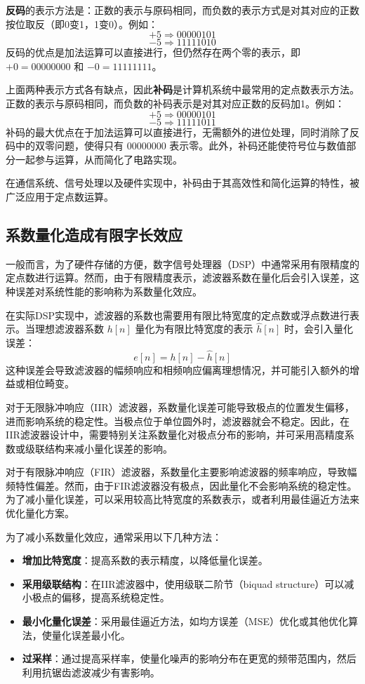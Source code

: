 \textbf{反码}的表示方法是：正数的表示与原码相同，而负数的表示方式是对其对应的正数按位取反（即0变1，1变0）。例如：
\[
+5 \Rightarrow 00000101
\]
\[
-5 \Rightarrow 11111010
\]
反码的优点是加法运算可以直接进行，但仍然存在两个零的表示，即 \(+0 = 00000000\) 和 \(-0 = 11111111\)。


上面两种表示方式各有缺点，因此\textbf{补码}是计算机系统中最常用的定点数表示方法。正数的表示与原码相同，而负数的补码表示是对其对应正数的反码加1。例如：
\[
+5 \Rightarrow 00000101
\]
\[
-5 \Rightarrow 11111011
\]
补码的最大优点在于加法运算可以直接进行，无需额外的进位处理，同时消除了反码中的双零问题，使得只有 \(00000000\) 表示零。此外，补码还能使符号位与数值部分一起参与运算，从而简化了电路实现。

在通信系统、信号处理以及硬件实现中，补码由于其高效性和简化运算的特性，被广泛应用于定点数运算。
\subsection{系数量化造成有限字长效应}
一般而言，为了硬件存储的方便，数字信号处理器（DSP）中通常采用有限精度的定点数进行运算。然而，由于有限精度表示，滤波器系数在量化后会引入误差，这种误差对系统性能的影响称为系数量化效应。

在实际DSP实现中，滤波器的系数也需要用有限比特宽度的定点数或浮点数进行表示。当理想滤波器系数 \( h[n] \) 量化为有限比特宽度的表示 \( \hat{h}[n] \) 时，会引入量化误差：
\begin{equation}
e[n] = h[n] - \hat{h}[n]
\end{equation}
这种误差会导致滤波器的幅频响应和相频响应偏离理想情况，并可能引入额外的增益或相位畸变。


对于无限脉冲响应（IIR）滤波器，系数量化误差可能导致极点的位置发生偏移，进而影响系统的稳定性。当极点位于单位圆外时，滤波器就会不稳定。因此，在IIR滤波器设计中，需要特别关注系数量化对极点分布的影响，并可采用高精度系数或级联结构来减小量化误差的影响。


对于有限脉冲响应（FIR）滤波器，系数量化主要影响滤波器的频率响应，导致幅频特性偏差。然而，由于FIR滤波器没有极点，因此量化不会影响系统的稳定性。为了减小量化误差，可以采用较高比特宽度的系数表示，或者利用最佳逼近方法来优化量化方案。

为了减小系数量化效应，通常采用以下几种方法：
\begin{itemize}
    \item \textbf{增加比特宽度}：提高系数的表示精度，以降低量化误差。
    \item \textbf{采用级联结构}：在IIR滤波器中，使用级联二阶节（biquad structure）可以减小极点的偏移，提高系统稳定性。
    \item \textbf{最小化量化误差}：采用最佳逼近方法，如均方误差（MSE）优化或其他优化算法，使量化误差最小化。
    \item \textbf{过采样}：通过提高采样率，使量化噪声的影响分布在更宽的频带范围内，然后利用抗锯齿滤波减少有害影响。
\end{itemize}

